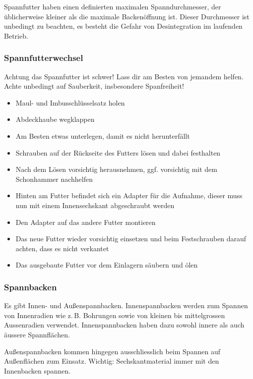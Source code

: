 \documentclass{\basedir/fablab-document}
\begin{document}
Spannfutter haben einen definierten maximalen Spanndurchmesser, der üblicherweise kleiner als die maximale Backenöffnung ist. Dieser Durchmesser ist unbedingt zu beachten, es besteht die Gefahr von Desintegration im laufenden Betrieb.

\subsubsection{Spannfutterwechsel}

Achtung das Spannfutter ist schwer! Lass dir am Besten von jemandem helfen. Achte unbedingt auf Sauberkeit, insbesondere Spanfreiheit!
\begin{itemize}
\item Maul- und Imbusschlüsselsatz holen
\item Abdeckhaube wegklappen
\item Am Besten etwas unterlegen, damit es nicht herunterfällt
\item Schrauben auf der Rückseite des Futters lösen und dabei festhalten 
\item Nach dem Lösen vorsichtig herausnehmen, ggf. vorsichtig mit dem Schonhammer nachhelfen
\item Hinten am Futter befindet sich ein Adapter für die Aufnahme, dieser muss nun mit einem Innensechskant abgeschraubt werden
\item Den Adapter auf das andere Futter montieren
\item Das neue Futter wieder vorsichtig einsetzen und beim Festschrauben darauf achten, dass es nicht verkantet
\item Das ausgebaute Futter vor dem Einlagern säubern und ölen
\end{itemize}

\subsubsection{Spannbacken}

Es gibt Innen- und Außenspannbacken.
Innenspannbacken werden zum Spannen von Innenradien wie z.\,B. Bohrungen sowie von kleinen bis mittelgrossen Aussenradien verwendet. Innenspannbacken haben dazu sowohl innere als auch äussere Spannflächen.

Außenspannbacken kommen hingegen ausschliesslich beim Spannen auf Außenflächen zum Einsatz.
Wichtig: Sechskantmaterial immer mit den Innenbacken spannen.

\end{document}
